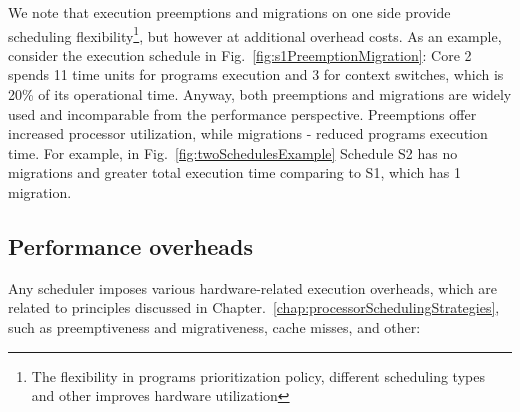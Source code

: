 We note that execution preemptions and migrations on one side provide scheduling flexibility\footnote{The flexibility in programs prioritization policy, different scheduling types and other improves hardware utilization}, but however at additional overhead costs. As an example, consider the execution schedule in Fig.~\ref{fig:s1PreemptionMigration}: Core 2 spends 11 time units for programs execution and 3 for context switches, which is 20\% of its operational time. Anyway, both preemptions and migrations are widely used and incomparable from the performance perspective. Preemptions offer increased processor utilization, while migrations \-- reduced programs execution time. For example, in Fig.~\ref{fig:twoSchedulesExample} Schedule S2 has no migrations and greater total execution time comparing to S1, which has 1 migration. 


\subsection*{\textbf{Performance overheads}}
\label{sec:performanceOverheads}

Any scheduler imposes various hardware-related execution overheads, which are related to principles discussed in Chapter.~\ref{chap:processorSchedulingStrategies}, such as preemptiveness and migrativeness, cache misses, and other:

